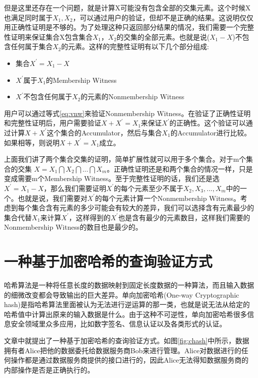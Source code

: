 但是这里还存在一个问题，就是计算X可能没有包含全部的交集元素。这个时候X也满足同时属于$X_1, X_2$，可以通过用户的验证，但却不是正确的结果。这说明仅仅用正确性证明是不够的。为了处理这种只返回部分结果的情况，我们需要一个完整性证明来保证集合X包含集合$X_1$，$X_2$的交集的全部元素。也就是说($X_1 - X$)不包含任何属于集合$X_2$的元素。这样的完整性证明有以下几个部分组成:
\begin{itemize}
\item 集合$X^\prime = X_1 - X$
\item $X^\prime$属于$X_1$的Membership Witness
\item $X^\prime$不包含任何属于$X_2$的元素的Nonmembership Witness
\end{itemize}

用户可以通过等式\ref{eq:vnw}来验证Nonmembership Witness。在验证了正确性证明和完整性证明后，用户需要验证$X + X^\prime = X_1$来保证$X^\prime$的正确性。这个验证可以通过计算$X + X^\prime$这个集合的Accumulator，然后与集合$X_1$的Accumulator进行比较。如果相等，则说明$X + X^\prime = X_1$成立。

上面我们讲了两个集合交集的证明，简单扩展性就可以用于多个集合。对于m个集合的交集 $X = X_1 \bigcap X_2 \bigcap ... \bigcap X_m$。正确性证明还是和两个集合的情况一样，只是变成需要m个Membership Witness。至于完整性证明的话，我们还是选$X^\prime = X_1 - X$，那么我们需要证明$X^\prime$的每个元素至少不属于$X_2, X_3,...,X_m$中的一个。也就是说，我们需要对$X^\prime$的每个元素计算一个Nonmembership Witness。考虑到每个集合含有元素的多少可能会有较大的差异，我们可以选择含有元素最少的集合代替$X_1$来计算$X^\prime$，这样得到的$X^\prime$也是含有最少的元素数目，这样我们需要的Nonmembership Witness的数目也是最少的。

\section{一种基于加密哈希的查询验证方式}
哈希算法是一种将任意长度的数据映射到固定长度数据的一种算法，而且输入数据的细微改变都会导致输出的巨大差异。单向加密哈希(One-way Cryptographic hash)\cite{CHash}是指哈希算法里面被认为无法进行逆运算的那一类，也就是说无法从给定的哈希值中计算出原来的输入数据是什么。由于这种不可逆性，单向加密哈希很多信息安全领域里众多应用，比如数字签名、信息认证以及各类形式的认证。

文章\cite{sion2005query}中就提出了一种基于加密哈希的查询验证方式。如图\ref{fig:chash}中所示，数据拥有者Alice把他的数据委托给数据服务商Bob来进行管理。Alice对数据进行的任何操作都是通过数据服务商提供的接口进行的，因此Alice无法得知数据服务商的内部操作是否是正确执行的。


